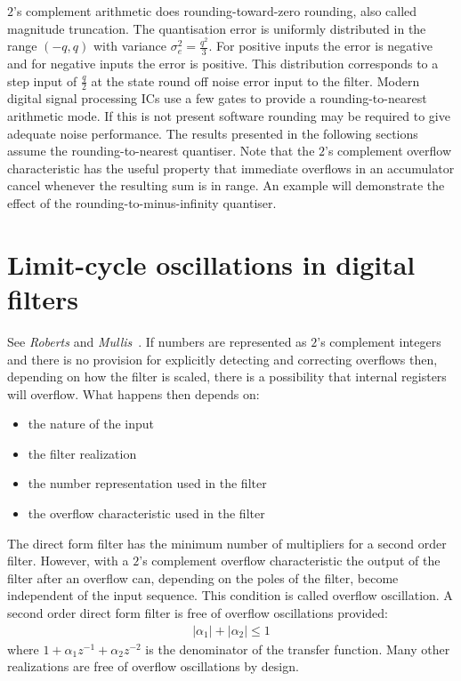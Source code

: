 \documentclass[a4paper,twoside,10pt,english]{report}
\begin{document}
$2$'s complement arithmetic does rounding-toward-zero rounding,
also called magnitude truncation. The quantisation error is uniformly
distributed in the range $\left(-q,q\right)$ with variance 
$\sigma_{e}^{2}=\frac{q^{2}}{3}$. For positive inputs the error is 
negative and for negative inputs the error is positive. 
This distribution corresponds to a step input of ${\frac{q}{2}}$
at the state round off noise error input to the filter. 
Modern digital signal processing ICs use a few gates to provide a 
rounding-to-nearest arithmetic mode. If this is not present software rounding
may be required to give adequate noise performance. The results presented in 
the following sections assume the rounding-to-nearest quantiser. Note 
that the $2$'s complement overflow characteristic has the useful property 
that immediate overflows in an accumulator cancel whenever the resulting sum
is in range. An example will demonstrate the effect of the 
rounding-to-minus-infinity quantiser. 

\section{Limit-cycle oscillations in digital filters}
See \emph{Roberts} and
\emph{Mullis}~\cite[Section 9.3]{RobertsMullis_DigitalSignalProcessing}. If
numbers are represented as $2$'s complement integers and there is no provision
for explicitly detecting and correcting overflows then, depending on how the
filter is scaled, there is a possibility that internal registers will overflow.
What happens then depends on:
\begin{itemize}
\item the nature of the input
\item the filter realization
\item the number representation used in the filter
\item the overflow characteristic used in the filter
\end{itemize}
The direct form filter has the minimum number of multipliers
for a second order filter. However, with a $2$'s complement overflow
characteristic the output of the filter after an overflow can, depending
on the poles of the filter, become independent of the input sequence.
This condition is called overflow oscillation. A second order direct
form filter is free of overflow oscillations provided:
\begin{align*}
\left|\alpha_{1}\right|+\left|\alpha_{2}\right| \le 1
\end{align*}
where $1+\alpha_{1}z^{-1}+\alpha_{2}z^{-2}$ is the denominator of the transfer 
function. Many other realizations are free of overflow oscillations by design.
\end{document}
